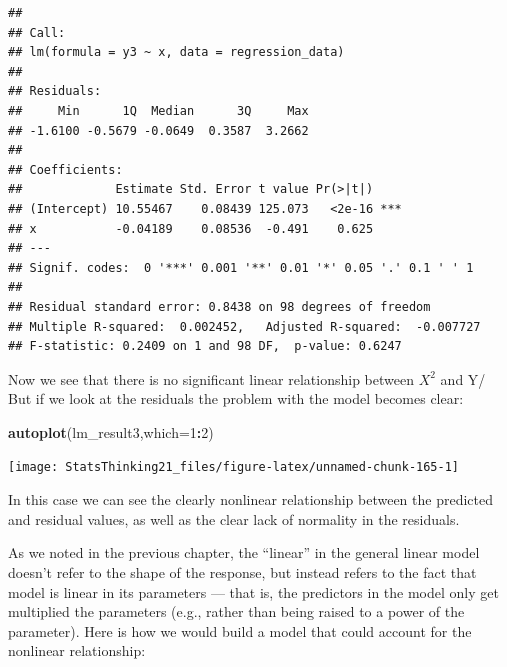 \documentclass[12pt,]{book}
\newenvironment{Shaded}{\begin{snugshade}}{\end{snugshade}}
\newcommand{\CommentTok}[1]{\textcolor[rgb]{0.56,0.35,0.01}{\textit{#1}}}
\newcommand{\DataTypeTok}[1]{\textcolor[rgb]{0.13,0.29,0.53}{#1}}
\newcommand{\DecValTok}[1]{\textcolor[rgb]{0.00,0.00,0.81}{#1}}
\newcommand{\KeywordTok}[1]{\textcolor[rgb]{0.13,0.29,0.53}{\textbf{#1}}}
\newcommand{\NormalTok}[1]{#1}
\newcommand{\OperatorTok}[1]{\textcolor[rgb]{0.81,0.36,0.00}{\textbf{#1}}}
\newcommand{\StringTok}[1]{\textcolor[rgb]{0.31,0.60,0.02}{#1}}
\begin{document}
\begin{verbatim}
## 
## Call:
## lm(formula = y3 ~ x, data = regression_data)
## 
## Residuals:
##     Min      1Q  Median      3Q     Max 
## -1.6100 -0.5679 -0.0649  0.3587  3.2662 
## 
## Coefficients:
##             Estimate Std. Error t value Pr(>|t|)    
## (Intercept) 10.55467    0.08439 125.073   <2e-16 ***
## x           -0.04189    0.08536  -0.491    0.625    
## ---
## Signif. codes:  0 '***' 0.001 '**' 0.01 '*' 0.05 '.' 0.1 ' ' 1
## 
## Residual standard error: 0.8438 on 98 degrees of freedom
## Multiple R-squared:  0.002452,   Adjusted R-squared:  -0.007727 
## F-statistic: 0.2409 on 1 and 98 DF,  p-value: 0.6247
\end{verbatim}

Now we see that there is no significant linear relationship between \(X^2\) and Y/ But if we look at the residuals the problem with the model becomes clear:

\begin{Shaded}
\begin{Highlighting}[]
\KeywordTok{autoplot}\NormalTok{(lm_result3,}\DataTypeTok{which=}\DecValTok{1}\OperatorTok{:}\DecValTok{2}\NormalTok{)}
\end{Highlighting}
\end{Shaded}

\texttt{[image: StatsThinking21\_files/figure-latex/unnamed-chunk-165-1]}

In this case we can see the clearly nonlinear relationship between the predicted and residual values, as well as the clear lack of normality in the residuals.

As we noted in the previous chapter, the ``linear'' in the general linear model doesn't refer to the shape of the response, but instead refers to the fact that model is linear in its parameters --- that is, the predictors in the model only get multiplied the parameters (e.g., rather than being raised to a power of the parameter). Here is how we would build a model that could account for the nonlinear relationship:

\begin{Shaded}
\end{Shaded}
\end{document}
